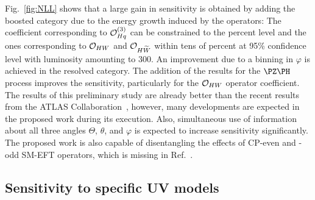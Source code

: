 \documentclass[a4paper,11pt]{article}
\begin{document}
Fig.~\ref{fig:NLL} shows that a large gain in sensitivity is obtained by adding the boosted category due to the energy growth induced by the operators:
The coefficient corresponding to ${\cal O}^{(3)}_{Hq}$ can be constrained to the percent level and the ones corresponding to ${\cal O}_{HW}$ and ${\cal O}_{H\widetilde{W}}$ within tens of percent at 95\% confidence level with luminosity amounting to 300\fbinv. 
An improvement due to a binning in $\varphi$ is achieved in the resolved category. 
The addition of the results for the $\PZ\PH$ process improves the sensitivity, particularly for the ${\cal O}_{HW}$ operator coefficient.
The results of this preliminary study are already better than the recent results from the ATLAS Collaboration~\cite{ATLAS-CONF-2021-051},
however, many developments are expected in the proposed work during its execution.
Also, simultaneous use of information about all three angles $\Theta$, $\theta$, and $\varphi$ is expected to increase sensitivity significantly.
The proposed work is also capable of disentangling the effects of CP-even and -odd SM-EFT operators, which is missing in Ref.~\cite{ATLAS-CONF-2021-051}. 

\subsection{Sensitivity to specific UV models}
\label{sec:Zprime}
\end{document}
